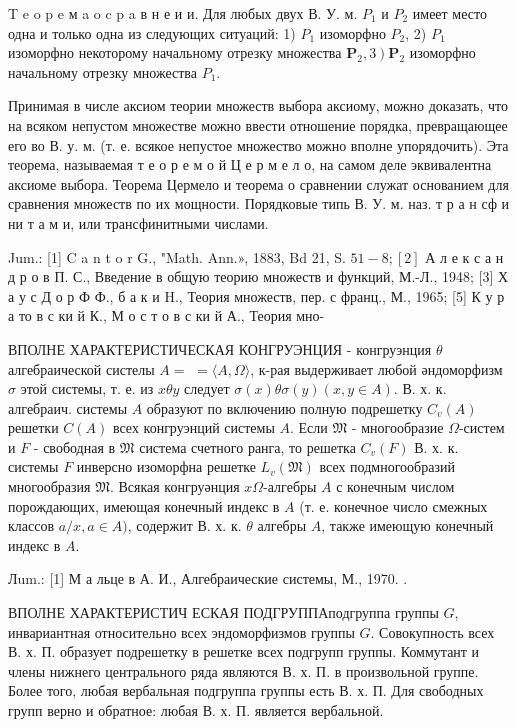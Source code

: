 \documentclass[10pt]{article}
\begin{document}
T e o p e м a o c p a в н е и и. Для любых двух В. У. м. $P_{1}$ и $P_{2}$ имеет место одна и только одна из следующих ситуаций: 1) $P_{1}$ изоморфно $P_{2}$, 2) $P_{1}$ изоморфно некоторому начальному отрезку множества $\left.\boldsymbol{P}_{2}, 3\right) \boldsymbol{P}_{2}$ изоморфно начальному отрезку множества $P_{1}$.



Принимая в числе аксиом теории множеств выбора аксиому, можно доказать, что на всяком непустом множестве можно ввести отношение порядка, превращающее его во В. у. м. (т. е. всякое непустое множество можно вполне упорядочить). Эта теорема, называемая т е о р е м о й Ц е р м е л о, на самом деле эквивалентна аксиоме выбора. Теорема Цермело и теорема о сравнении служат основанием для сравнения множеств по их мощности. Порядковые типь В. У. м. наз. т р а н сф и ни т а м и, или трансфинитными числами.



Jum.: [1] C a n t o r G., "Math. Ann.», 1883, Bd 21, S. $51-8 ;[2]$ А л е к с а н д р о в П. С., Введение в общую теорию множеств и функций, М.-Л., 1948; [3] Х а у с Д о р Ф Ф., б а к и H., Теория множеств, пер. с франц., М., 1965; [5] К у р а то в с ки й К., М о с т о в с ки й А., Теория мно-



ВПОЛНЕ ХАРАКТЕРИСТИЧЕСКАЯ КОНГРУЭНЦИЯ - конгруэнция $\theta$ алгебраической систелы $A=$ $=\langle A, \Omega\rangle$, к-рая выдерживает любой әндоморфизм $\sigma$ этой системы, т. е. из $x \theta y$ следует $\sigma(x) \theta \sigma(y)(x, y \in A)$. В. х. к. алгебраич. системы $A$ образуют по включению полную подрешетку $C_{v}(A)$ решетки $C(A)$ всех конгруэнций системы $A$. Если $\mathfrak{M}$ - многообразие $\Omega$-систем и $F$ - свободная в $\mathfrak{M}$ система счетного ранга, то решетка $C_{v}(F)$ В. х. к. системы $F$ инверсно изоморфна решетке $L_{v}(\mathfrak{M})$ всех подмногообразий многообразия $\mathfrak{M}$. Всякая конгруәнция $x \Omega$-алгебры $A$ с конечным числом порождающих, имеющая конечный индекс в $A$ (т. е. конечное число смежных классов $a / x, a \in A)$, содержит В. х. к. $\theta$ алгебры $A$, также имеющую конечный индекс в $A$.



Лum.: [1] М а льце в А. И., Алгебраические системы, М., 1970. .



ВПОЛНЕ ХАРАКТЕРИСТИЧ ЕСКАЯ ПОДГРУППАподгруппа группы $G$, инвариантная относительно всех эндоморфизмов группы $G$. Совокупность всех В. х. П. образует подрешетку в решетке всех подгрупп группы. Коммутант и члены нижнего центрального ряда являются В. х. П. в произвольной группе. Более того, любая вербальная подгруппа группы есть В. х. П. Для свободных групп верно и обратное: любая В. х. П. является вербальной.
\end{document}
